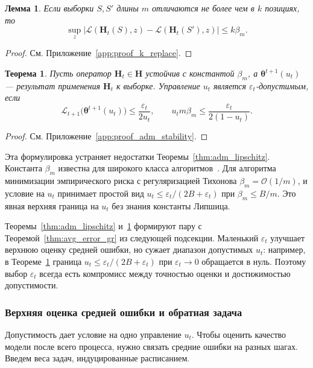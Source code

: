 \documentclass[a4paper,14pt,oneside,openany]{extarticle}
\newtheorem{theorem}{Теорема}
\newtheorem{lemma}{Лемма}
\newcommand{\bH}{\mathbf{H}}
\newcommand{\cL}{\mathcal{L}}
\newcommand{\btheta}{\boldsymbol{\theta}}
\begin{document}
\begin{lemma}\label{lem:k_replace_gr}
    Если выборки $S, S'$ длины $m$ отличаются не более чем в $k$ позициях, то
    \[
        \sup_z \bigl|\cL(\bH_t(S), z) - \cL(\bH_t(S'), z)\bigr| \le k \beta_m.
    \]
\end{lemma}

\begin{proof}См. Приложение~\ref{app:proof_k_replace}.\end{proof}

\begin{theorem}\label{thm:adm_stability}
    Пусть оператор $\bH_t \in \bH$ устойчив с константой $\beta_m$, а $\btheta^{t+1}(u_t)$ — результат применения $\bH_t$ к выборке. Управление $u_t$ является $\varepsilon_t$-допустимым, если
    \[
        \cL_{t+1}\bigl(\btheta^{t+1}(u_t)\bigr) \le \frac{\varepsilon_t}{2 u_t}, \qquad u_t m \beta_m \le \frac{\varepsilon_t}{2 (1 - u_t)}.
    \]
\end{theorem}

\begin{proof}См. Приложение~\ref{app:proof_adm_stability}.\end{proof}

Эта формулировка устраняет недостатки Теоремы~\ref{thm:adm_lipschitz}. Константа $\beta_m$ известна для широкого класса алгоритмов~\cite{bousquet2002stability, hardt2016train}. Для алгоритма минимизации эмпирического риска с регуляризацией Тихонова $\beta_m = \mathcal{O}(1/m)$, и условие на $u_t$ принимает простой вид $u_t \le \varepsilon_t / (2B + \varepsilon_t)$ при $\beta_m \le B / m$. Это явная верхняя граница на $u_t$ без знания константы Липшица.

Теоремы~\ref{thm:adm_lipschitz} и~\ref{thm:adm_stability} формируют пару с Теоремой~\ref{thm:avg_error_gr} из следующей подсекции. Маленький $\varepsilon_t$ улучшает верхнюю оценку средней ошибки, но сужает диапазон допустимых $u_t$: например, в Теореме~\ref{thm:adm_stability} граница $u_t \le \varepsilon_t/(2B + \varepsilon_t)$ при $\varepsilon_t \to 0$ обращается в нуль. Поэтому выбор $\varepsilon_t$ всегда есть компромисс между точностью оценки и достижимостью допустимости.

\subsubsection{Верхняя оценка средней ошибки и обратная задача}

Допустимость дает условие на одно управление $u_t$. Чтобы оценить качество модели после всего процесса, нужно связать средние ошибки на разных шагах. Введем веса задач, индуцированные расписанием.
\end{document}

